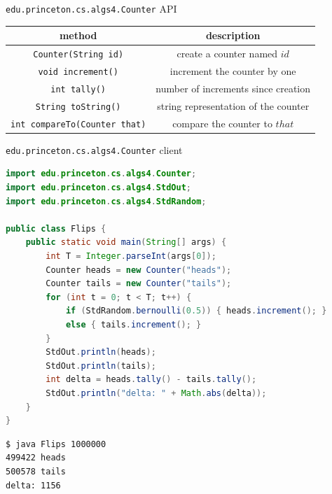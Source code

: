 \documentclass[8pt,a4paper,compress]{beamer}
\begin{document}
\begin{frame}[fragile]
\pause

\lstinline{edu.princeton.cs.algs4.Counter} API
\begin{center}
\begin{tabular}{cc}
method & description \\ \hline
\lstinline$Counter(String id)$ & create a counter named $id$ \\
\lstinline$void increment()$ & increment the counter by one \\
\lstinline$int tally()$ & number of increments since creation \\
\lstinline$String toString()$ & string representation of the counter \\
\lstinline$int compareTo(Counter that)$ & compare the counter to $that$
\end{tabular} 
\end{center}

\pause

\lstinline{edu.princeton.cs.algs4.Counter} client
\begin{lstlisting}[language=Java]
import edu.princeton.cs.algs4.Counter;
import edu.princeton.cs.algs4.StdOut;
import edu.princeton.cs.algs4.StdRandom;

public class Flips {
    public static void main(String[] args) {
        int T = Integer.parseInt(args[0]);
        Counter heads = new Counter("heads");
        Counter tails = new Counter("tails");
        for (int t = 0; t < T; t++) {
            if (StdRandom.bernoulli(0.5)) { heads.increment(); }
            else { tails.increment(); }
        }
        StdOut.println(heads);
        StdOut.println(tails);
        int delta = heads.tally() - tails.tally();
        StdOut.println("delta: " + Math.abs(delta));
    }
}
\end{lstlisting}

\pause

\begin{lstlisting}[language={}]
$ java Flips 1000000
499422 heads
500578 tails
delta: 1156
\end{lstlisting}
\end{frame}
\end{document}
